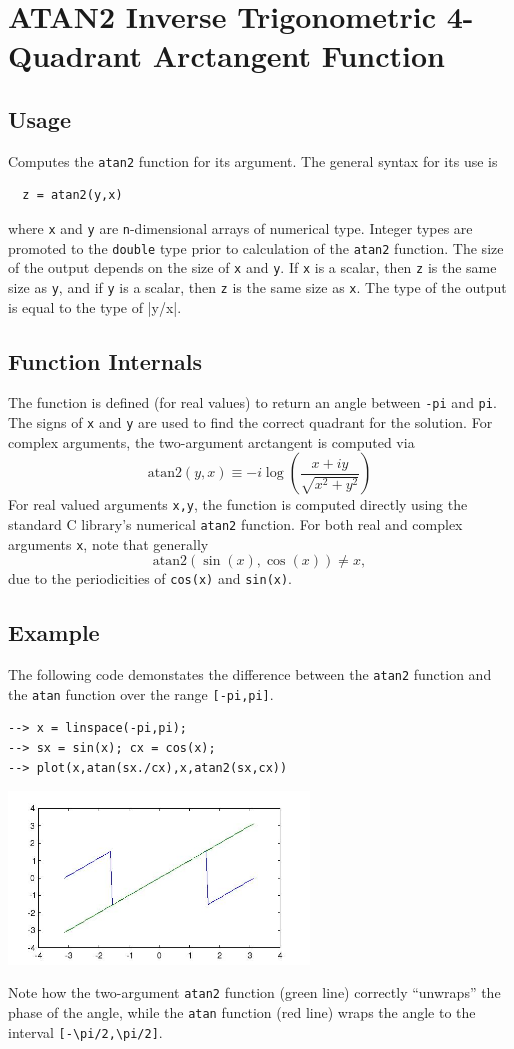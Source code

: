 \section{ATAN2 Inverse Trigonometric 4-Quadrant Arctangent Function}

\subsection{Usage}

Computes the \verb|atan2| function for its argument.  The general
syntax for its use is
\begin{verbatim}
  z = atan2(y,x)
\end{verbatim}
where \verb|x| and \verb|y| are \verb|n|-dimensional arrays of numerical type.
Integer types are promoted to the \verb|double| type prior to
calculation of the \verb|atan2| function. The size of the output depends
on the size of \verb|x| and \verb|y|.  If \verb|x| is a scalar, then \verb|z|
is the same size as \verb|y|, and if \verb|y| is a scalar, then \verb|z|
is the same size as \verb|x|.  The type of the output is equal to the type of
|y/x|.  
\subsection{Function Internals}

The function is defined (for real values) to return an 
angle between \verb|-pi| and \verb|pi|.  The signs of \verb|x| and \verb|y|
are used to find the correct quadrant for the solution.  For complex
arguments, the two-argument arctangent is computed via
\[
  \mathrm{atan2}(y,x) \equiv -i \log\left(\frac{x+i y}{\sqrt{x^2+y^2}} \right)
\]
For real valued arguments \verb|x,y|, the function is computed directly using 
the standard C library's numerical \verb|atan2| function. For both 
real and complex arguments \verb|x|, note that generally
\[
  \mathrm{atan2}(\sin(x),\cos(x)) \neq x,
\]
due to the periodicities of  \verb|cos(x)| and \verb|sin(x)|.
\subsection{Example}

The following code demonstates the difference between the \verb|atan2| 
function and the \verb|atan| function over the range \verb|[-pi,pi]|.
\begin{verbatim}
--> x = linspace(-pi,pi);
--> sx = sin(x); cx = cos(x);
--> plot(x,atan(sx./cx),x,atan2(sx,cx))
\end{verbatim}


\centerline{\includegraphics[width=8cm]{atan2plot}}

Note how the two-argument \verb|atan2| function (green line) 
correctly ``unwraps'' the phase of the angle, while the \verb|atan| 
function (red line) wraps the angle to the interval \verb|[-\pi/2,\pi/2]|.
